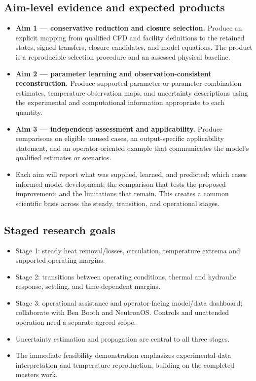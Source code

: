 \subsection{Aim-level evidence and expected products}\label{subsec:aim-level-evidence-and-products}
\begin{itemize}[leftmargin=*]
\item \textbf{Aim 1 --- conservative reduction and closure selection.} Produce an explicit mapping from qualified CFD and facility definitions to the retained states, signed transfers, closure candidates, and model equations. The product is a reproducible selection procedure and an assessed physical baseline.
\item \textbf{Aim 2 --- parameter learning and observation-consistent reconstruction.} Produce supported parameter or parameter-combination estimates, temperature observation maps, and uncertainty descriptions using the experimental and computational information appropriate to each quantity.
\item \textbf{Aim 3 --- independent assessment and applicability.} Produce comparisons on eligible unused cases, an output-specific applicability statement, and an operator-oriented example that communicates the model's qualified estimates or scenarios.
\item Each aim will report what was supplied, learned, and predicted; which cases informed model development; the comparison that tests the proposed improvement; and the limitations that remain. This creates a common scientific basis across the steady, transition, and operational stages.
\end{itemize}

\subsection{Staged research goals}\label{subsec:staged-research-goals}

\begin{itemize}[leftmargin=*]
\item Stage 1: steady heat removal/\allowbreak{}losses, circulation, temperature extrema and supported operating margins.
\item Stage 2: transitions between operating conditions, thermal and hydraulic response, settling, and time-dependent margins.
\item Stage 3: operational assistance and operator-facing model/\allowbreak{}data dashboard; collaborate with Ben Booth and NeutronOS. Controls and unattended operation need a separate agreed scope.
\item Uncertainty estimation and propagation are central to all three stages.
\item The immediate feasibility demonstration emphasizes experimental-data interpretation and temperature reproduction, building on the completed master\textquotesingle{}s work.
\end{itemize}

